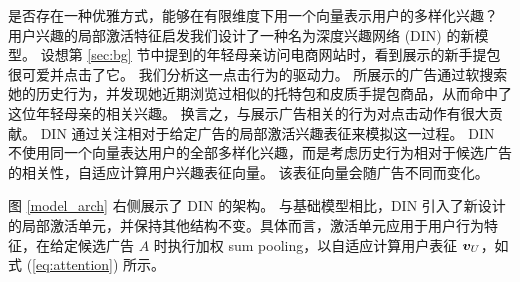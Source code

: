 是否存在一种优雅方式，能够在有限维度下用一个向量表示用户的多样化兴趣？
用户兴趣的局部激活特征启发我们设计了一种名为深度兴趣网络 (DIN) 的新模型。
设想第 \ref{sec:bg} 节中提到的年轻母亲访问电商网站时，看到展示的新手提包很可爱并点击了它。
我们分析这一点击行为的驱动力。
所展示的广告通过软搜索她的历史行为，并发现她近期浏览过相似的托特包和皮质手提包商品，从而命中了这位年轻母亲的相关兴趣。
换言之，与展示广告相关的行为对点击动作有很大贡献。
DIN 通过关注相对于给定广告的局部激活兴趣表征来模拟这一过程。
DIN 不使用同一个向量表达用户的全部多样化兴趣，而是考虑历史行为相对于候选广告的相关性，自适应计算用户兴趣表征向量。
该表征向量会随广告不同而变化。

图 \ref{model_arch} 右侧展示了 DIN 的架构。
与基础模型相比，DIN 引入了新设计的局部激活单元，并保持其他结构不变。具体而言，激活单元应用于用户行为特征，在给定候选广告 $A$ 时执行加权 sum pooling，以自适应计算用户表征 $\boldsymbol{v}_U$，如式 (\ref{eq:attention}) 所示。



